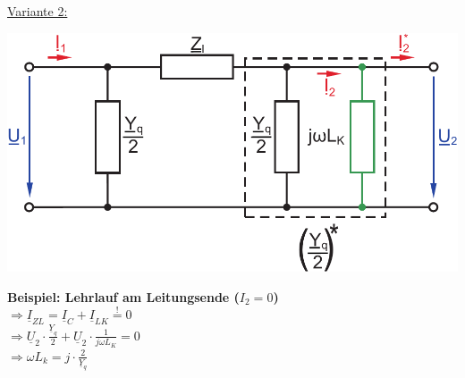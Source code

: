 \documentclass[a4paper,twocolumn,10pt]{article}
\newcommand{\sollsein}{\stackrel{!}{=}}
\begin{document}
\underline{Variante 2:}
\begin{center}
\includegraphics[width=0.85\columnwidth]{Grafiken/Querkompensation_12}
\end{center}
\textbf{Beispiel: Lehrlauf am Leitungsende ($I_2=0$)}\\
$\Rightarrow \underline{I}_{ZL}=\underline{I}_C+\underline{I}_{LK}\sollsein 0$\\
$\Rightarrow \underline{U}_2\cdot\frac{\underline{Y}_q}{2} + \underline{U}_2\cdot\frac{1}{j\omega L_K}=0$\\
$\Rightarrow \omega L_k=j\cdot\frac{2}{\underline{Y}_q}$
\end{document}
